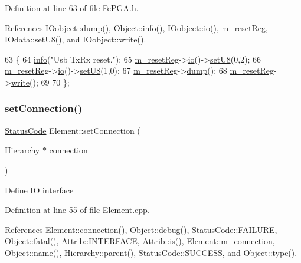 Definition at line 63 of file Fe\+P\+G\+A.\+h.



References I\+Oobject\+::dump(), Object\+::info(), I\+Oobject\+::io(), m\+\_\+reset\+Reg, I\+Odata\+::set\+U8(), and I\+Oobject\+::write().


\begin{DoxyCode}
63                  \{
64     \hyperlink{classObject_a644fd329ea4cb85f54fa6846484b84a8}{info}(\textcolor{stringliteral}{"Usb TxRx reset."});
65     \hyperlink{classFePGA_aeff1a2370237a06b50e1ae23d933c862}{m\_resetReg}->\hyperlink{classIOobject_af04fb94137c3d86849f478ac5afab5d1}{io}()->\hyperlink{classIOdata_a6c4fb2f2af01889ada889c2b7aceb24d}{setU8}(0,2);
66     \hyperlink{classFePGA_aeff1a2370237a06b50e1ae23d933c862}{m\_resetReg}->\hyperlink{classIOobject_af04fb94137c3d86849f478ac5afab5d1}{io}()->\hyperlink{classIOdata_a6c4fb2f2af01889ada889c2b7aceb24d}{setU8}(1,0); 
67     \hyperlink{classFePGA_aeff1a2370237a06b50e1ae23d933c862}{m\_resetReg}->\hyperlink{classIOobject_a1247f08c84c1732a76caf07e987871e9}{dump}();
68     \hyperlink{classFePGA_aeff1a2370237a06b50e1ae23d933c862}{m\_resetReg}->\hyperlink{classIOobject_a9f6984bc9f0fadcf800f1be2523ac744}{write}();
69     
70   \};
\end{DoxyCode}
\mbox{\label{classElement_ab476b4b1df5954141ceb14f072433b89}} 
\subsubsection{\texorpdfstring{set\+Connection()}{setConnection()}}
{\footnotesize\ttfamily \hyperlink{classStatusCode}{Status\+Code} Element\+::set\+Connection (\begin{DoxyParamCaption}\item[{\hyperlink{classHierarchy}{Hierarchy} $\ast$}]{connection }\end{DoxyParamCaption})\hspace{0.3cm}{\ttfamily [inherited]}}

Define IO interface 

Definition at line 55 of file Element.\+cpp.



References Element\+::connection(), Object\+::debug(), Status\+Code\+::\+F\+A\+I\+L\+U\+RE, Object\+::fatal(), Attrib\+::\+I\+N\+T\+E\+R\+F\+A\+CE, Attrib\+::is(), Element\+::m\+\_\+connection, Object\+::name(), Hierarchy\+::parent(), Status\+Code\+::\+S\+U\+C\+C\+E\+SS, and Object\+::type().



